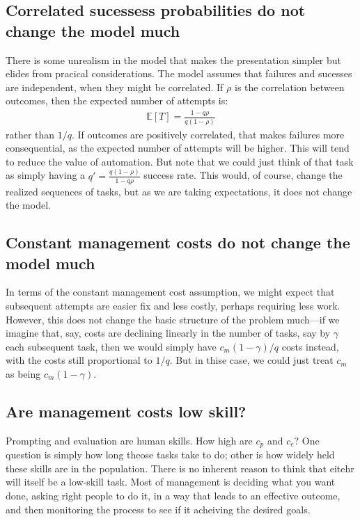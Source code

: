 \documentclass{article}
\begin{document}
\subsection{Correlated sucessess probabilities do not change the model much} \label{sec:correlated_successes}
There is some unrealism in the model that makes the presentation simpler but elides from pracical considerations.
The model assumes that failures and sucesses are independent, when they might be correlated.
If $\rho$ is the correlation between outcomes, then the expected number of attempts is:
\begin{align}
\mathbb{E}[T] = \frac{1 - q\rho}{q(1 - \rho)} 
\end{align}
rather than $1/q$.
If outcomes are positively correlated, that makes failures more consequential, as the expected number of attempts will be higher. 
This will tend to reduce the value of automation.
But note that we could just think of that task as simply having a $q' = \frac{q(1 - \rho)}{1 - q\rho}$ success rate.
This would, of course, change the realized sequences of tasks, but as we are taking expectations, it does not change the model.

\subsection{Constant management costs do not change the model much} \label{sec:constant_management_costs}
In terms of the constant management cost assumption, we might expect that subsequent attempts are easier fix and less costly, perhaps requiring less work. 
However, this does not change the basic structure of the problem much---if we imagine that, say, costs are declining linearly in the number of tasks, say by $\gamma$ each subsequent task, then we would simply have $c_m (1-\gamma) / q$ costs instead, with the costs still proportional to $1/q$. 
But in thise case, we could just treat $c_m$ as being $c_m (1-\gamma)$. 
  
\subsection{Are management costs low skill?}
Prompting and evaluation are human skills.
How high are $c_p$ and $c_e$?
One question is simply how long theose tasks take to do; other is how widely held these skills are in the population.
There is no inherent reason to think that eitehr will itself be a low-skill task.
Most of management is deciding what you want done, asking right people to do it, in a way that leads to an effective outcome, and then monitoring the process to see if it acheiving the desired goals.
  
\end{document}
